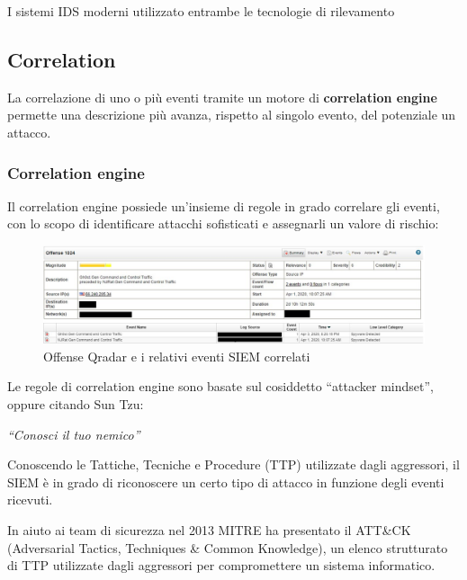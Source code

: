 \begin{itemize}
\end{itemize}

I sistemi IDS moderni utilizzato entrambe le tecnologie di rilevamento 

\subsection{Correlation}

La correlazione di uno o più eventi tramite un motore di \textbf{correlation engine} permette una descrizione più avanza, rispetto al singolo evento, del potenziale un attacco.\par

\subsubsection{Correlation engine}

Il correlation engine possiede un’insieme di regole in grado correlare gli eventi, con lo scopo di identificare attacchi sofisticati e assegnarli un valore di rischio:

\begin{figure}[h]
\begin{center}
\includegraphics[width=0.95\columnwidth]{images/2_architettura_img/QRadarOffense.png}
\end{center}
\caption{Offense Qradar e i relativi eventi SIEM correlati}
\label{fig:Offense Qradar e i relativi eventi SIEM correlati}
\end{figure}


Le regole di correlation engine sono basate sul cosiddetto “attacker mindset”, oppure citando Sun Tzu: 

\begin{center}
    \textit{“Conosci il tuo nemico”}
\end{center}

Conoscendo le Tattiche, Tecniche e Procedure (TTP) utilizzate dagli aggressori, il SIEM è in grado di riconoscere un certo tipo di attacco in funzione degli eventi ricevuti.\par

In aiuto ai team di sicurezza nel 2013 MITRE ha presentato il ATT\&CK (Adversarial Tactics, Techniques \& Common Knowledge), un elenco strutturato di TTP utilizzate dagli aggressori per compromettere un sistema informatico.

